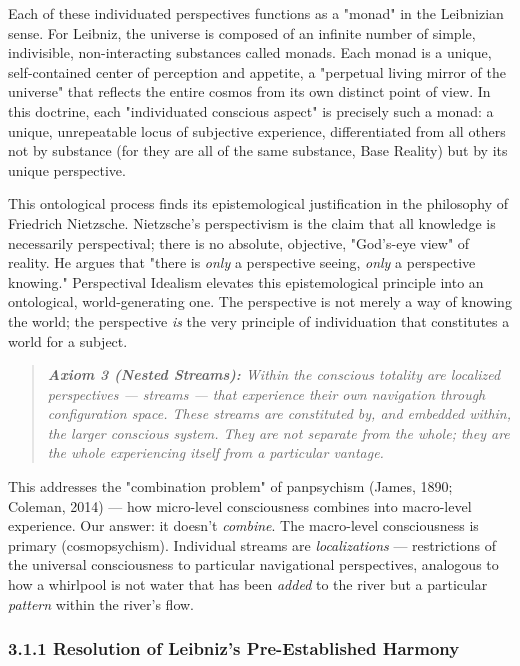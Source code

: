Each of these individuated perspectives functions as a "monad" in the Leibnizian sense. For Leibniz, the universe is composed of an infinite number of simple, indivisible, non-interacting substances called monads. Each monad is a unique, self-contained center of perception and appetite, a "perpetual living mirror of the universe" that reflects the entire cosmos from its own distinct point of view. In this doctrine, each "individuated conscious aspect" is precisely such a monad: a unique, unrepeatable locus of subjective experience, differentiated from all others not by substance (for they are all of the same substance, Base Reality) but by its unique perspective.


This ontological process finds its epistemological justification in the philosophy of Friedrich Nietzsche. Nietzsche's perspectivism is the claim that all knowledge is necessarily perspectival; there is no absolute, objective, "God's-eye view" of reality. He argues that "there is \textit{only} a perspective seeing, \textit{only} a perspective knowing." Perspectival Idealism elevates this epistemological principle into an ontological, world-generating one. The perspective is not merely a way of knowing the world; the perspective \textit{is} the very principle of individuation that constitutes a world for a subject.


\begin{quote}
\itshape
\textbf{Axiom 3 (Nested Streams):} \textit{Within the conscious totality are localized perspectives — streams — that experience their own navigation through configuration space. These streams are constituted by, and embedded within, the larger conscious system. They are not separate from the whole; they are the whole experiencing itself from a particular vantage.}
\end{quote}


This addresses the "combination problem" of panpsychism (James, 1890; Coleman, 2014) — how micro-level consciousness combines into macro-level experience. Our answer: it doesn't \textit{combine}. The macro-level consciousness is primary (cosmopsychism). Individual streams are \textit{localizations} — restrictions of the universal consciousness to particular navigational perspectives, analogous to how a whirlpool is not water that has been \textit{added} to the river but a particular \textit{pattern} within the river's flow.


\subsubsection*{3.1.1 Resolution of Leibniz's Pre-Established Harmony}


